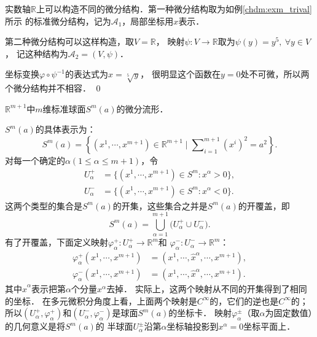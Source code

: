 \begin{example}\label{chdm:exm_bu-tong-jie-gou}
    实数轴$\mathbb{R}$上可以构造不同的微分结构．第一种微分结构取为如例\ref{chdm:exm_trival}所示
    的标准微分结构，记为$\mathscr{A}_1$，局部坐标用$x$表示．
    
    第二种微分结构可以这样构造，取$V=\mathbb{R}$，
    映射$\psi:V\to \mathbb{R}$取为$\psi(y)=y^5, \  \forall y \in V$，
    记这种结构为$\mathscr{A}_2=(V,\psi)$．
    
    坐标变换$\varphi \circ \psi^{-1}$的表达式为$x=\sqrt[5]{y}$，
    很明显这个函数在$y=0$处不可微，所以两个微分结构并不相容． \qed
\end{example}

\begin{example}\label{chdm:exm_sphere1}
    $\mathbb{R}^{m+1}$中$m$维标准球面$S^m(a)$的微分流形．
\end{example}
$S^m(a)$的具体表示为：
\begin{equation}
    S^m(a)=\left\{(x^1, \cdots, x^{m+1}) \in \mathbb{R}^{m+1} \mid \sum\nolimits_{i=1}^{m+1}(x^i)^2= a^2 \right\} .
\end{equation}
对每一个确定的$\alpha(1\leqslant \alpha \leqslant m+1)$，令
\begin{align*}
    U_\alpha ^{+} &= \{(x^1,\cdots,x^{m+1})\in S^m: x^\alpha > 0 \},  \\
    U_\alpha ^{-} &= \{(x^1,\cdots,x^{m+1})\in S^m: x^\alpha < 0 \}.
\end{align*}
这两个类型的集合是$S^m(a)$的开集，这些集合之并是$S^m(a)$的开覆盖，即
\begin{equation}
    S^m(a)= \bigcup_{\alpha=1}^{m+1} \bigl(U_\alpha ^{+} \cup U_\alpha ^{-} \bigr).
\end{equation}
有了开覆盖，下面定义映射$\varphi_\alpha ^{+}: U_\alpha ^{+} \to \mathbb{R}^m$和
$\varphi_\alpha ^{-}: U_\alpha ^{-} \to \mathbb{R}^m$：
\begin{align}
    \varphi_\alpha ^{+}(x^1,\cdots,x^{m+1}) &= (x^1,\cdots,\hat{x}^\alpha, \cdots,x^{m+1}), \\
    \varphi_\alpha ^{-}(x^1,\cdots,x^{m+1}) &= (x^1,\cdots,\hat{x}^\alpha, \cdots,x^{m+1}).
\end{align}
其中$\hat{x}^\alpha$表示把第$\alpha$个分量${x}^\alpha$去掉．
实际上，这两个映射从不同的开集得到了相同的坐标．
在多元微积分角度上看，上面两个映射是$C^\infty$的，它们的逆也是$C^\infty$的；
所以$(U_\alpha ^{+}, \varphi_\alpha ^{+})$和$(U_\alpha ^{-}, \varphi_\alpha ^{-})$是球面$S^m(a)$的坐标卡．
映射$\varphi_\alpha ^{\pm}$（取$\alpha$为固定数值）的几何意义是将$S^m(a)$的
半球面$U_\alpha ^{\pm}$沿第$\alpha$坐标轴投影到$x^\alpha=0$坐标平面上．

